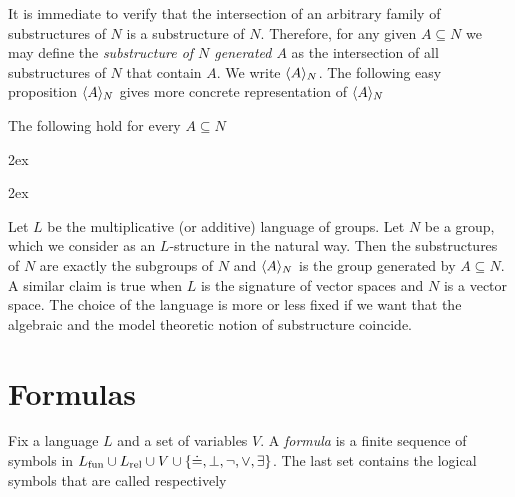It is immediate to verify that the intersection of an arbitrary family of substructures of $N$ is a substructure of $N$. Therefore, for any given $A\subseteq N$ we may define the \emph{substructure of $N$ generated $A$\/} as the intersection of all substructures of $N$ that contain $A$. We write \emph{$\langle A\rangle_N$}. The following easy proposition $\langle A\rangle_N$ gives more concrete representation of $\langle A\rangle_N$
%
\begin{lemma}\label{strutturagenerata}
The following hold for every $A\subseteq N$



\kern2ex

\kern2ex\QED

\begin{example}
Let $L$ be the multiplicative (or additive) language of groups. Let $N$ be a group, which we consider as an $L$-structure in the natural way. Then the substructures of $N$ are exactly the subgroups of $N$ and $\langle A\rangle_N$ is the group generated by $A\subseteq N$. A similar claim is true when $L$ is the signature of vector spaces and $N$ is a vector space. The choice of the language is more or less fixed if we want that the algebraic and the model theoretic notion of substructure coincide.\QED
\end{example}
\end{lemma}


\section{Formulas}\label{sintassformule}


Fix a language $L$ and a set of variables $V$. A \emph{formula} is a finite sequence of symbols in $L_{\rm fun}\cup L_{\rm rel}\cup V\cup \{\doteq,\bot,\neg,\vee,\exists\}$. The last set contains the logical symbols that are called respectively


\def\medrel#1{\parbox[t]{4ex}{#1}}
\def\ceq#1#2{\medrel{#1}{\parbox{25ex}{#2}}}


